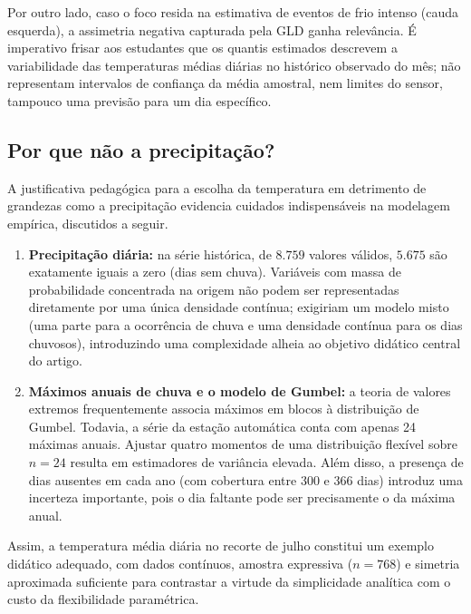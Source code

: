 Por outro lado, caso o foco resida na estimativa de eventos de frio intenso (cauda esquerda), a assimetria negativa capturada pela GLD ganha relevância. É imperativo frisar aos estudantes que os quantis estimados descrevem a variabilidade das temperaturas médias diárias no histórico observado do mês; não representam intervalos de confiança da média amostral, nem limites do sensor, tampouco uma previsão para um dia específico.

\subsection{Por que não a precipitação?}

A justificativa pedagógica para a escolha da temperatura em detrimento de grandezas como a precipitação evidencia cuidados indispensáveis na modelagem empírica, discutidos a seguir.

\begin{enumerate}
    \item \textbf{Precipitação diária:} na série histórica, de $8.759$ valores válidos, $5.675$ são exatamente iguais a zero (dias sem chuva). Variáveis com massa de probabilidade concentrada na origem não podem ser representadas diretamente por uma única densidade contínua; exigiriam um modelo misto (uma parte para a ocorrência de chuva e uma densidade contínua para os dias chuvosos), introduzindo uma complexidade alheia ao objetivo didático central do artigo.
    \item \textbf{Máximos anuais de chuva e o modelo de Gumbel:} a teoria de valores extremos frequentemente associa máximos em blocos à distribuição de Gumbel. Todavia, a série da estação automática conta com apenas 24 máximas anuais. Ajustar quatro momentos de uma distribuição flexível sobre $n = 24$ resulta em estimadores de variância elevada. Além disso, a presença de dias ausentes em cada ano (com cobertura entre 300 e 366 dias) introduz uma incerteza importante, pois o dia faltante pode ser precisamente o da máxima anual.
\end{enumerate}

Assim, a temperatura média diária no recorte de julho constitui um exemplo didático adequado, com dados contínuos, amostra expressiva ($n = 768$) e simetria aproximada suficiente para contrastar a virtude da simplicidade analítica com o custo da flexibilidade paramétrica.
